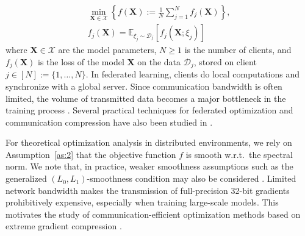 \documentclass[letterpaper]{article} %
\begin{document}
\begin{multline}
\min_{\mathbf{X} \in \mathcal{X}} \left\{ f(\mathbf{X}) := \frac{1}{N}\sum_{j=1}^N f_j(\mathbf{X})\right\}, \\
f_j(\mathbf{X})=\mathbb{E}_{\xi_j\sim\mathcal{D}_j}[f_j(\mathbf{X};\xi_j)]
\label{fed_eq}
\end{multline}
where $\mathbf{X} \in \mathcal{X}$ are the model parameters, $N \ge 1$ is the number of clients, and $f_j(\mathbf{X})$ is the loss of the model $\mathbf{X}$ on the data $\mathcal{D}_j$, stored on client $j \in [N] := \{1, \dots, N\}$. In federated learning, clients do local computations and synchronize with a global server. Since communication bandwidth is often limited, the volume of transmitted data becomes a major bottleneck in the training process \cite{bernstein2019signsgdmajority, horvath2023stochastic}. Several practical techniques for federated optimization and communication compression have also been studied in \cite{beznosikov2020biased, gruntkowska2025error, ahn2025dion}.

For theoretical optimization analysis in distributed environments, we rely on Assumption~\ref{as:2} that the objective function $f$ is smooth w.r.t.\ the spectral norm. 
We note that, in practice, weaker smoothness assumptions such as the generalized $(L_0,L_1)$-smoothness condition may also be considered \cite{pethick2025generalized}. 
Limited network bandwidth makes the transmission of full-precision 32-bit gradients prohibitively expensive, especially when training large-scale models. This motivates the study of communication-efficient optimization methods based on extreme gradient compression \cite{bernstein2018signsgd, bernstein2019signsgdmajority, beznosikov2020biased}.
\end{document}
